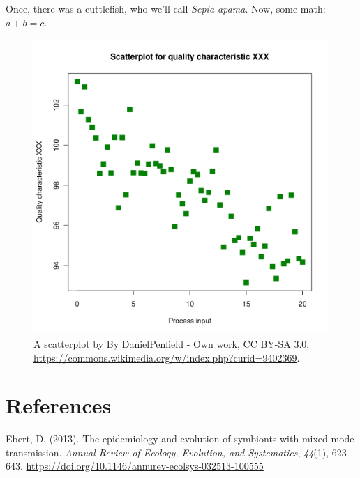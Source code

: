 \documentclass[10pt]{article}
\begin{document}
Once, there was a cuttlefish, who we'll call \emph{Sepia apama}. Now,
some math: \(a + b = c\).
\begin{figure}[h!]
\begin{center}
\includegraphics[width=0.70\columnwidth]{figures/scatterplot/scatterplot}
\caption{{A scatterplot by By DanielPenfield - Own work, CC BY-SA 3.0,
\url{https://commons.wikimedia.org/w/index.php?curid=9402369}.
{\label{286335}}%
}}
\end{center}
\end{figure}

\section*{References}\sloppy
{}
\label{csl:1}Ebert, D. (2013). {The epidemiology and evolution of symbionts with mixed-mode transmission}. \textit{Annual Review of Ecology, Evolution, and Systematics}, \textit{44}(1), 623–643. \url{https://doi.org/10.1146/annurev-ecolsys-032513-100555}
\end{document}
